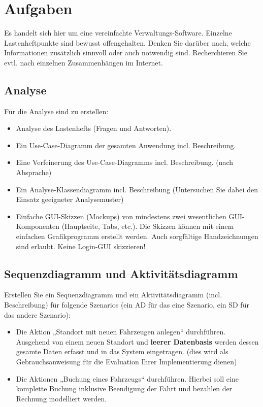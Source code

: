 \chapter{Aufgaben}

Es handelt sich hier um eine vereinfachte Verwaltungs-Software. 
Einzelne Lastenheftpunkte sind bewusst offengehalten. 
Denken Sie darüber nach, welche Informationen zusätzlich sinnvoll oder auch notwendig sind. 
Recherchieren Sie evtl. nach einzelnen Zusammenhängen im Internet. 

\section{Analyse}

Für die Analyse sind zu erstellen: 

\begin{itemize}
    \item Analyse des Lastenhefts (Fragen und Antworten).  
    \item Ein Use-Case-Diagramm der gesamten Anwendung incl. Beschreibung. 
    \item Eine Verfeinerung des Use-Case-Diagramms incl. Beschreibung. (nach Absprache) 
    \item Ein Analyse-Klassendiagramm incl. Beschreibung (Untersuchen Sie dabei den Einsatz geeigneter Analysemuster) 
    \item Einfache GUI-Skizzen (Mockups) von mindestens zwei wesentlichen GUI-Komponenten (Hauptseite, Tabs, etc.). Die Skizzen können mit einem einfachen Grafikprogramm erstellt werden. Auch sorgfältige Handzeichnungen sind erlaubt. Keine Login-GUI skizzieren! 
\end{itemize}

\section{Sequenzdiagramm und Aktivitätsdiagramm}

Erstellen Sie ein Sequenzdiagramm und ein Aktivitätsdiagramm (incl. Beschreibung) für folgende Szenarios (ein AD für das eine Szenario, ein SD für das andere Szenario): 

\begin{itemize}
    \item Die Aktion „Standort mit neuen Fahrzeugen anlegen“ durchführen. Ausgehend von einem neuen Standort und \textbf{leerer Datenbasis} werden dessen gesamte Daten erfasst und in das System eingetragen. (dies wird als Gebrauchsanweisung für die Evaluation Ihrer Implementierung dienen) 
    \item Die Aktionen „Buchung eines Fahrzeugs“ durchführen. Hierbei soll eine komplette Buchung inklusive Beendigung der Fahrt und bezahlen der Rechnung modelliert werden.  
\end{itemize}

